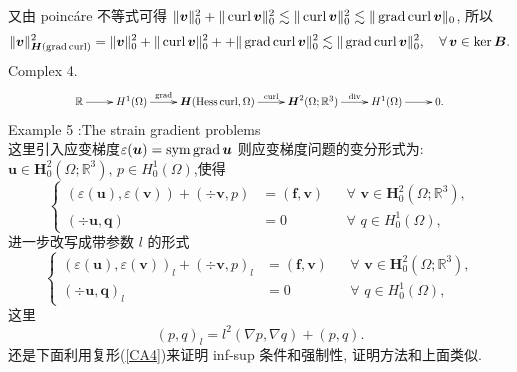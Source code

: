 又由 poinc\'{a}re 不等式可得 $\|\boldsymbol{v}\|_{0}^{2}+\|\operatorname{curl}\boldsymbol{v}\|_{0}^{2}\lesssim\|\operatorname{curl}\boldsymbol{v}\|_{0}^2\lesssim\|\operatorname{grad}\operatorname{curl}\boldsymbol{v}\|_{0}$,
所以
\begin{align*}
\|\boldsymbol{v}\|_{\boldsymbol{H}(\operatorname{grad}\operatorname{curl})}^2=\|\boldsymbol{v}\|_{0}^2+\|\operatorname{curl}\boldsymbol{v}\|_{0}^2++\|\operatorname{grad}\operatorname{curl}\boldsymbol{v}\|_{0}^2
\lesssim\|\operatorname{grad}\operatorname{curl}\boldsymbol{v}\|_{0}^2,\quad\forall \,\boldsymbol{v}\in \ker \boldsymbol{B}.
\end{align*}
Complex 4.
 \begin{equation}\label{CA4}
	\resizebox{0.8\hsize}{!}{$
		\begin{array}{c}
			\xymatrix{	
\mathbb{R} \ar[r] & H^{1}(\Omega)\ar[r]^-{\grad} & \boldsymbol{H}(\mathrm{Hess}\curl,\Omega)  \ar[r]^-{\curl}
				& \boldsymbol{H}^{2}(\Omega;\mathbb{R}^{3})    \ar[r]^-{\div} & H^{1}(\Omega) \ar[r]^{} & 0 .
 }
		\end{array}
		$}
	\end{equation}
Example 5 :The strain gradient problems\\
这里引入应变梯度$\varepsilon(\boldsymbol{u})=\operatorname{sym}\operatorname{grad}\boldsymbol{u}$
则应变梯度问题的变分形式为: $\boldsymbol{u}\in\boldsymbol{H}_{0}^2(\Omega;\mathbb{R}^{3}),\,p\in H_0^{1}(\Omega)$,使得
\begin{equation}\label{Cq10}
\left\{
\begin{aligned}
(\varepsilon(\boldsymbol{u}),\varepsilon(\boldsymbol{v}))+(\div\boldsymbol{v},p)&=(\boldsymbol{f},\boldsymbol{v})
  &&\forall \,\, \boldsymbol{v}\in \boldsymbol{H}_{0}^2(\Omega;\mathbb{R}^{3}),
 \\
 ( \div\boldsymbol{u},\boldsymbol{q}) &=0 &&\forall \,\, q\in H_0^{1}(\Omega),
\end{aligned}\right.
\end{equation}
进一步改写成带参数 $l$ 的形式
\begin{equation}\label{Cq11}
\left\{
\begin{aligned}
(\varepsilon(\boldsymbol{u}),\varepsilon(\boldsymbol{v}))_{l}+(\div\boldsymbol{v},p)_{l}&=(\boldsymbol{f},\boldsymbol{v})
  &&\forall \,\, \boldsymbol{v}\in \boldsymbol{H}_{0}^2(\Omega;\mathbb{R}^{3}),
 \\
 ( \div\boldsymbol{u},\boldsymbol{q})_{l} &=0 &&\forall \,\, q\in H_0^{1}(\Omega),
\end{aligned}\right.
\end{equation}
这里
$$(p,q)_l=l^2(\nabla p,\nabla q)+(p,q).$$
还是下面利用复形(\ref{CA4})来证明 inf-sup 条件和强制性, 证明方法和上面类似.

